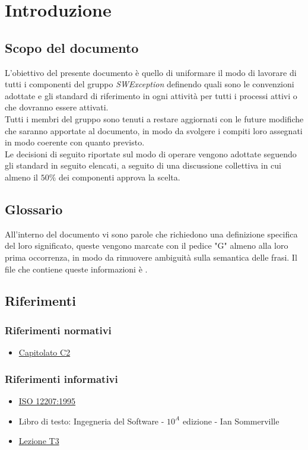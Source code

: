 \section{Introduzione} \label{_introduzione}
\subsection{Scopo del documento}
L'obiettivo del presente documento è quello di uniformare il modo di lavorare di tutti i
componenti del gruppo \textit{SWException} definendo quali sono le convenzioni adottate e gli
standard di riferimento in ogni attività per tutti i processi attivi o che dovranno essere
attivati.\\
Tutti i membri del gruppo sono tenuti a restare aggiornati con le future modifiche che saranno apportate al documento,
in modo da svolgere i compiti loro assegnati in modo coerente con quanto previsto.\\
Le decisioni di seguito riportate sul modo di operare vengono adottate seguendo gli standard in seguito elencati,
a seguito di una discussione collettiva in cui almeno il $50\%$ dei componenti approva la scelta.

\subsection{Glossario}
All'interno del documento vi sono parole che richiedono una definizione specifica del loro significato,
queste vengono marcate con il pedice "G" almeno alla loro prima occorrenza, in modo da rimuovere ambiguità
sulla semantica delle frasi. Il file che contiene queste informazioni è .

\subsection{Riferimenti}
\subsubsection{Riferimenti normativi}
\begin{itemize}
    \item \href{https://www.math.unipd.it/~tullio/IS-1/2020/Progetto/C2.pdf}{Capitolato C2}
\end{itemize}

\subsubsection{Riferimenti informativi}
\begin{itemize}
    \item \href{https://www.math.unipd.it/~tullio/IS-1/2009/Approfondimenti/ISO_12207-1995.pdf}{ISO 12207:1995}
    \item Libro di testo: Ingegneria del Software - $10^A$ edizione - Ian Sommerville
    \item \href{https://www.math.unipd.it/~tullio/IS-1/2020/Dispense/L03.pdf}{Lezione T3}
\end{itemize}
